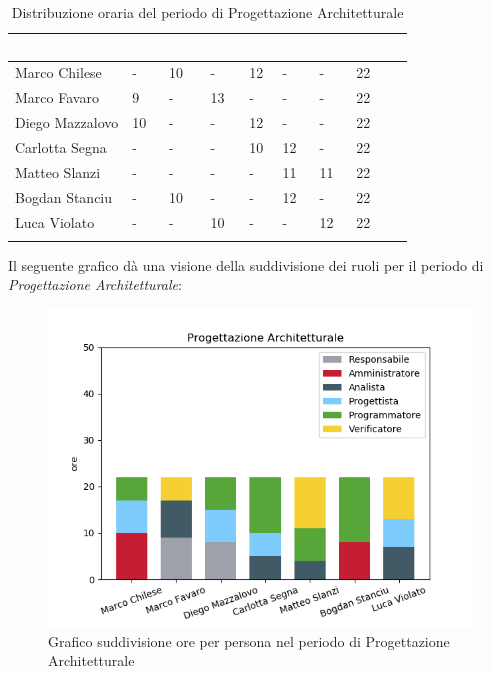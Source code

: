 \begin{longtable}{|C{.30\textwidth}|C{.06\textwidth}|C{.06\textwidth}|C{.06\textwidth} | C{.06\textwidth}| C{.06\textwidth} | C{.06\textwidth} | C{.10\textwidth} |}
\hline
{}	\textbf{\textcolor{white}{Nome}} & \textbf{\textcolor{white}{RE}} & \textbf{\textcolor{white}{AM}} & \textbf{\textcolor{white}{AN}} & \textbf{\textcolor{white}{PJ}} & \textbf{\textcolor{white}{PR}} & \textbf{\textcolor{white}{VE}} & \textbf{\textcolor{white}{Totale}}\\
\hline 
Marco Chilese & - & 10 & - & 12 & - & - & 22 \\
\hline
{}Marco Favaro & 9 & - & 13 & - & - & - & 22 \\
\hline
Diego Mazzalovo & 10 & - & - & 12 & - & - & 22 \\ 
\hline
{}Carlotta Segna & - & - & - & 10 & 12 & - & 22 \\
\hline
Matteo Slanzi & - & - & - & - & 11 & 11 & 22 \\
\hline
{}Bogdan Stanciu & - & 10 & - & - & 12 & - & 22 \\
\hline
Luca Violato & - & - & 10 & - & - & 12 & 22 \\
\hline 

\caption{Distribuzione oraria del periodo di Progettazione Architetturale}
\label{Distribuzione oraria del periodo di pa}
\end{longtable}

Il seguente grafico dà una visione della suddivisione dei ruoli per il periodo di \textit{Progettazione Architetturale}:

\begin{figure}[H]
	\centering
  		\includegraphics[width=1\linewidth]{./images/fig_pa.png}
  		\caption{Grafico suddivisione ore per persona nel periodo di Progettazione Architetturale}
  		\label{fig:grafico suddivione ruoli periodo di pa}
\end{figure}



